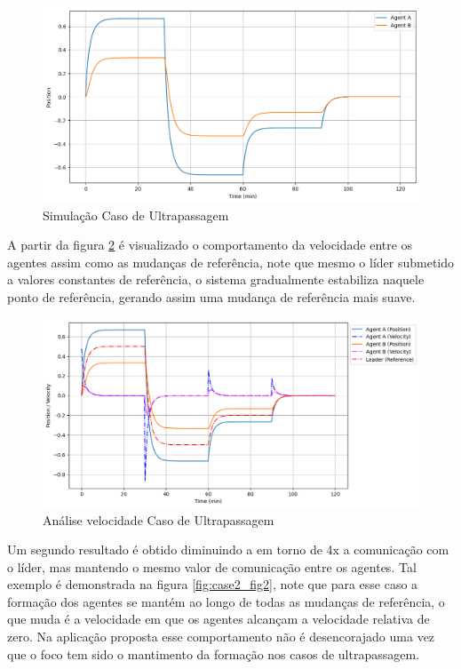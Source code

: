 \begin{figure}[ht]
    \centering
    \caption{Simulação Caso de Ultrapassagem}
    \label{fig:case1}
    \includegraphics[width=1\linewidth]{figures/Simulation/Cooperativo/case1.png}
\end{figure}

A partir da figura \ref{fig:case1_fig2} é visualizado o comportamento da velocidade entre os agentes assim como as mudanças de referência, note que mesmo o líder submetido a valores constantes de referência, o sistema gradualmente estabiliza naquele ponto de referência, gerando assim uma mudança de referência mais suave.
\begin{figure}[ht]
    \centering
    \caption{Análise velocidade Caso de Ultrapassagem}
    \label{fig:case1_fig2}
    \includegraphics[width=1\linewidth]{figures/Simulation/Cooperativo/case1_fg2.png}
\end{figure}

Um segundo resultado é obtido diminuindo a em torno de 4x a comunicação com o líder, mas mantendo o mesmo valor de comunicação entre os agentes. Tal exemplo é demonstrada na figura \ref{fig:case2_fig2}, note que para esse caso a formação dos agentes se mantém ao longo de todas as mudanças de referência, o que muda é a velocidade em que os agentes alcançam a velocidade relativa de zero. Na aplicação proposta esse comportamento não é desencorajado uma vez que o foco tem sido o mantimento da formação nos casos de ultrapassagem.

